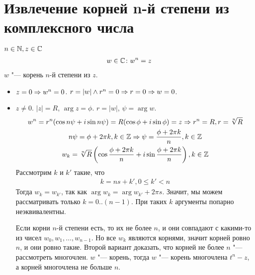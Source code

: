 \section{Извлечение корней n-й степени из комплексного числа}

\begin{Def}
$n \in \mathbb{N}, z \in \mathbb{C}$
\begin{gather*}
w \in \mathbb{C}\colon w^n = z
\end{gather*}
$w$ "--- корень $n$-й степени из $z$.
\end{Def}

\begin{itemize}
\item $z = 0 \Rightarrow w^n = 0$. $r = |w| \land r^n = 0 \Rightarrow r = 0 \Rightarrow w = 0$.
\item $z \ne 0$. $|z| = R$, $\arg z = \phi$. $r = |w|$, $\psi = \arg w$.
\begin{gather*}
w^n = r^n(\cos n\psi + i \sin n\psi) = R(\cos\phi + i \sin \phi) = z \Rightarrow r^n = R, r = \sqrt[n]{R} \\
n \psi = \phi + 2 \pi k, k \in \mathbb{Z} \Rightarrow \psi = \frac{\phi + 2 \pi k}{n}, k \in \mathbb{Z} \\
w_k = \sqrt[n]{R}\left(\cos{\frac{\phi + 2 \pi k}{n}} + i \sin{\frac{\phi + 2 \pi k}{n}}\right), k \in \mathbb{Z}
\end{gather*}
Рассмотрим $k$ и $k'$ такие, что 
\begin{gather*}
k = ns + k', 0 \leqslant k' < n
\end{gather*}
Тогда $w_k = w_{k'}$, так как $\arg w_k = \arg w_{k'} + 2 \pi s$. Значит, мы можем рассматривать только $k=0..(n - 1)$. При таких $k$ аргументы попарно неэквивалентны.

Если корни $n$-й степени есть, то их не более $n$, и они совпадают с какими-то из чисел $w_0, w_1, \ldots, w_{n - 1}$.  Но все $w_k$ являются корнями, значит корней ровно $n$, и они ровно такие. 
Второй вариант доказать, что корней не более $n$ "--- рассмотреть многочлен.
$w$ "--- корень, тогда $w$ "--- корень многочлена $t^n - z$, а корней многочлена не больше $n$. 
\end{itemize}